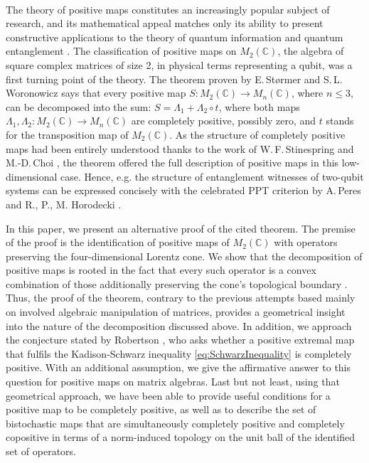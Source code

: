 \documentclass[12pt]{article}
\theoremstyle{plain}
\theoremstyle{definition}
\theoremstyle{remark}
\numberwithin{equation}{section}
\begin{document}
\paragraph{}
The theory of positive maps constitutes an increasingly popular subject of research,
and its mathematical appeal matches only its ability to present constructive
applications to the theory of quantum information and quantum entanglement
\cite{stormer2012positive, chruscinski2014entanglement}.
The classification of positive maps on $M_{2}(\mathbb{C})$,
the algebra of square complex matrices of size 2,
in physical terms representing a qubit,
was a first turning point of the theory.
The theorem proven by E.\,Størmer 
\cite{stormer1963positive}
and S.\,L.\,Woronowicz
\cite{woronowicz1976positive}
says that every positive map
$S: M_{2}(\mathbb{C}) \rightarrow M_{n}(\mathbb{C})$,
where $n \leq 3$, can be decomposed into the sum:
$S = \Lambda_{1} + \Lambda_{2} \circ t$,
where both maps $\Lambda_{1}, \Lambda_{2}: M_{2}(\mathbb{C}) \rightarrow M_{n}(\mathbb{C})$
are completely positive, possibly zero,
and $t$ stands for the transposition map of $M_{2}(\mathbb{C})$.
As the structure of completely positive maps had been entirely understood
thanks to the work of 
W.\,F.\,Stinespring
\cite{stinespring1955positive}
and M.-D.\,Choi
\cite{choi1975completely},
the theorem offered the full description of positive maps in this low-dimensional case.
Hence, e.g. the structure of entanglement witnesses of two-qubit systems can be
expressed concisely with the celebrated PPT criterion by
A.\,Peres 
\cite{peres1996separability}
and R., P., M. Horodecki \cite{horodecki1996separability}.

In this paper, we present an alternative proof of the cited theorem.
The premise of the proof is the identification of positive maps
of $M_{2}(\mathbb{C})$ with operators preserving the four-dimensional Lorentz cone.
We show that the decomposition of positive maps is rooted in the fact that
every such operator is a convex combination of those additionally preserving
the cone's topological boundary 
\cite{loewy1975positive}.
Thus, the proof of the theorem,
contrary to the previous attempts based mainly
on involved algebraic manipulation of matrices,
provides a geometrical insight into the nature of the decomposition discussed above.
In addition, we approach the conjecture stated by Robertson
\cite{robertson1983schwarz},
who asks whether a positive extremal map that fulfils the Kadison-Schwarz
inequality \eqref{eq:SchwarzInequality} is completely positive.
With an additional assumption, we give the affirmative answer to this question
for positive maps on matrix algebras.
Last but not least, using that geometrical approach,
we have been able to provide useful conditions for a positive map to be completely positive,
as well as to describe the set of bistochastic maps that are simultaneously
completely positive and completely copositive in terms of
a norm-induced topology on the unit ball of the identified set of operators.
\end{document}
